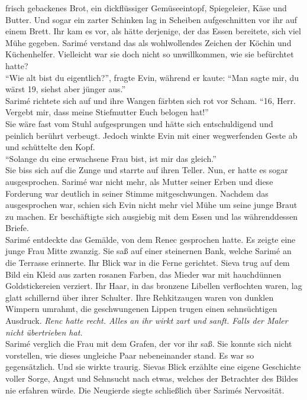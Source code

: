 frisch gebackenes Brot, ein dickflüssiger Gemüseeintopf, Spiegeleier, Käse und Butter. Und sogar 
ein zarter Schinken lag in Scheiben aufgeschnitten vor ihr auf einem Brett. Ihr kam es vor, als 
hätte derjenige, der das Essen bereitete, sich viel Mühe gegeben. Sarimé verstand das als 
wohlwollendes Zeichen der Köchin und Küchenhelfer. Vielleicht war sie doch nicht so unwillkommen, 
wie sie befürchtet hatte?\\
``Wie alt bist du eigentlich?'', fragte Evin, während er kaute: ``Man sagte mir, du wärst 19, 
siehst aber jünger aus.''\\
Sarimé richtete sich auf und ihre Wangen färbten sich rot vor Scham. ``16, Herr. Vergebt mir, dass 
meine Stiefmutter Euch belogen hat!''\\
Sie wäre fast vom Stuhl aufgesprungen und hätte sich entschuldigend und peinlich berührt verbeugt. 
Jedoch winkte Evin mit einer wegwerfenden Geste ab und schüttelte den Kopf.\\
``Solange du eine erwachsene Frau bist, ist mir das gleich.''\\
Sie biss sich auf die Zunge und starrte auf ihren Teller. Nun, er hatte es sogar ausgesprochen. 
Sarimé war nicht mehr, als Mutter seiner Erben und diese Forderung war deutlich in seiner Stimme 
mitgeschwungen. Nachdem das ausgesprochen war, schien sich Evin nicht mehr viel Mühe um seine junge 
Braut zu machen. Er beschäftigte sich ausgiebig mit dem Essen und las währenddessen Briefe.\\
Sarimé entdeckte das Gemälde, von dem Renec gesprochen hatte. Es zeigte eine junge Frau Mitte 
zwanzig. Sie saß auf einer steinernen Bank, welche Sarimé an die Terrasse erinnerte. Ihr Blick war 
in die Ferne gerichtet. Sieva trug auf dem Bild ein Kleid aus zarten rosanen Farben, das Mieder war 
mit hauchdünnen Goldstickereien verziert. Ihr Haar, in das bronzene Libellen verflochten waren, lag 
glatt schillernd über ihrer Schulter. Ihre Rehkitzaugen waren von dunklen Wimpern umrahmt, die 
geschwungenen Lippen trugen einen sehnsüchtigen Ausdruck. \textit{Renc hatte recht. Alles an ihr 
wirkt zart und sanft. Falls der Maler nicht übertrieben hat.}\\
Sarimé verglich die Frau mit dem Grafen, der vor ihr saß. Sie konnte sich nicht vorstellen, wie 
dieses ungleiche Paar nebeneinander stand. Es war so gegensätzlich. Und sie wirkte traurig. Sievas 
Blick erzählte eine eigene Geschichte voller Sorge, Angst und Sehnsucht nach etwas, welches der 
Betrachter des Bildes nie erfahren würde. Die Neugierde siegte schließlich über Sarimés Nervosität. 
